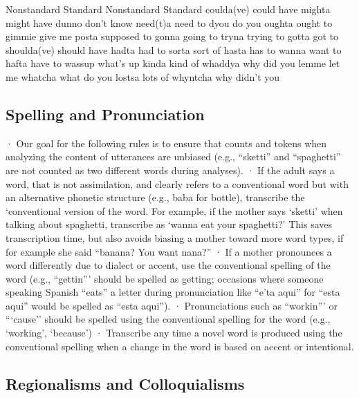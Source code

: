 \documentclass[
]{book}
\begin{document}
Nonstandard
Standard
Nonstandard
Standard
coulda(ve)
could have
mighta
might have
dunno
don't know
need(t)a
need to
dyou
do you
oughta
ought to
gimmie
give me
posta
supposed to
gonna
going to
tryna
trying to
gotta
got to
shoulda(ve)
should have
hadta
had to
sorta
sort of
hasta
has to
wanna
want to
hafta
have to
wassup
what's up
kinda
kind of
whaddya
why did you
lemme
let me
whatcha
what do you
lostsa
lots of
whyntcha
why didn't you

\hypertarget{spelling-and-pronunciation}{%
\subsection{Spelling and Pronunciation}\label{spelling-and-pronunciation}}

· Our goal for the following rules is to ensure that counts and tokens when analyzing the content of utterances are unbiased (e.g., ``sketti'' and ``spaghetti'' are not counted as two different words during analyses).
· If the adult says a word, that is not assimilation, and clearly refers to a conventional word but with an alternative phonetic structure (e.g., baba for bottle), transcribe the `conventional version of the word. For example, if the mother says `sketti' when talking about spaghetti, transcribe as `wanna eat your spaghetti?' This saves transcription time, but also avoids biasing a mother toward more word types, if for example she said ``banana? You want nana?''
· If a mother pronounces a word differently due to dialect or accent, use the conventional spelling of the word (e.g., ``gettin''' should be spelled as getting; occasions where someone speaking Spanish ``eats'' a letter during pronunciation like ``e'ta aqui'' for ``esta aqui'' would be spelled as ``esta aqui'').
· Pronunciations such as ``workin''' or ```cause'' should be spelled using the conventional spelling for the word (e.g., `working', `because')
· Transcribe any time a novel word is produced using the conventional spelling when a change in the word is based on accent or intentional.

\hypertarget{regionalisms-and-colloquialisms}{%
\subsection{Regionalisms and Colloquialisms}\label{regionalisms-and-colloquialisms}}
\end{document}
